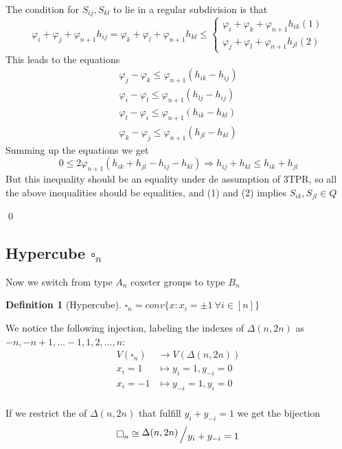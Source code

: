 \documentclass{myclass}
\newtheorem*{definition}{Definition}
\newcommand{\bigslant}[2]{{\raisebox{.2em}{$#1$}\left/\raisebox{-.2em}{$#2$}\right.}}
\begin{document}
The condition for $S_{ij}, S_{kl}$ to lie in a regular subdivision is that
\[
\varphi _i + \varphi _j + \varphi _{n+1} h_{ij} = 
\varphi _k + \varphi _l + \varphi _{n+1} h_{kl} \le 
\begin{cases}
  \varphi _i + \varphi _k + \varphi _{n+1}h_{ik} (1)\\
  \varphi _j + \varphi _l + \varphi _{n+1}h_{jl} (2)
\end{cases}
\] 
This leads to the equations
\begin{align*}
 \varphi _j - \varphi _k \le \varphi _{n+1}(h_{ik}-h_{ij})  \\
 \varphi _i - \varphi _l \le \varphi _{n+1}(h_{lj}-h_{ij})  \\
 \varphi _l - \varphi _i \le \varphi _{n+1}(h_{ik}-h_{kl})  \\
 \varphi _k - \varphi _j \le \varphi _{n+1}(h_{jl}-h_{kl})
\end{align*}
Summing up the equations we get
\[
0\le 2\varphi_{n+1}(h_{ik}+ h_{jl} - h_{ij}-h_{kl}) \Rightarrow h_{ij} + h_{kl} \le h_{ik} + h_{jl}
\] 
But this inequality should be an equality under de assumption of 3TPR, so all the above inequalities should be equalities, and (1) and (2) implies $S_{ik}, S_{jl}\in Q$

\qed

\subsection{Hypercube $\square_n$}

Now we switch from type $A_n$ coxeter groups to type $B_n$

\begin{definition}[Hypercube]
$\square_n  = conv\{x: x_i = \pm 1 \ \forall i \in [n]\}$
\end{definition}

We notice the following injection, labeling the indexes of $\Delta(n, 2n)$ as  $-n, -n+1,  \ldots -1, 1, 2, \ldots ,n$:
\begin{align*}
  V(\square_n) &\to V(\Delta(n, 2n)) \\
  x_i = 1 & \mapsto y_i=1, y_{-i}=0 \\
  x_i = -1 & \mapsto y_{-i}=1, y_{i}=0 \\
\end{align*}

If we restrict the of $\Delta(n, 2n)$ that fulfill $y_i + y_{-i} = 1$ we get the bijection
\[
\square_n \cong \bigslant{\Delta(n, 2n)}{y_i+y_{-i}=1}
\] 
\end{document}
